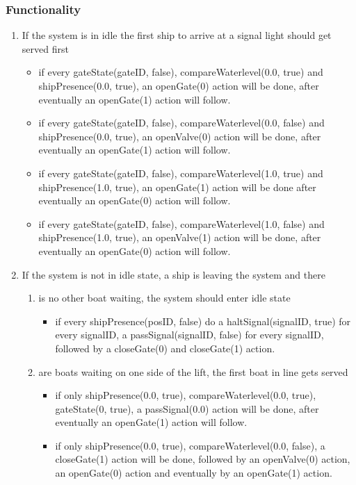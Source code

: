 \subsubsection*{Functionality}
\begin{enumerate}
	\item If the system is in idle the first ship to arrive at a signal light should get served first
	\begin{itemize}
		\item if every gateState(gateID, false), compareWaterlevel(0.0, true) and shipPresence(0.0, true), an openGate(0) action will be done, after eventually an openGate(1) action will follow.
		\item if every gateState(gateID, false), compareWaterlevel(0.0, false) and shipPresence(0.0, true), an openValve(0) action will be done, after eventually an openGate(1) action will follow.
		\item if every gateState(gateID, false), compareWaterlevel(1.0, true) and shipPresence(1.0, true), an openGate(1) action will be done after eventually an openGate(0) action will follow.
		\item if every gateState(gateID, false), compareWaterlevel(1.0, false) and shipPresence(1.0, true), an openValve(1) action will be done, after eventually an openGate(0) action will follow.
	\end{itemize}
	\item If the system is not in idle state, a ship is leaving the system and there
	\begin{enumerate}
		\item is no other boat waiting, the system should enter idle state
		\begin{itemize}
			\item if every shipPresence(posID, false) do a haltSignal(signalID, true) for every signalID, a passSignal(signalID, false) for every signalID, followed by a closeGate(0) and closeGate(1) action.
		\end{itemize}
		\item are boats waiting on one side of the lift, the first boat in line gets served
		\begin{itemize}
			\item if only shipPresence(0.0, true), compareWaterlevel(0.0, true), gateState(0, true), a passSignal(0.0) action will be done, after eventually an openGate(1) action will follow.
			\item if only shipPresence(0.0, true), compareWaterlevel(0.0, false), a closeGate(1) action will be done, followed by an openValve(0) action, an openGate(0) action and eventually by an openGate(1) action.

\end{itemize}
\end{enumerate}
\end{enumerate}
